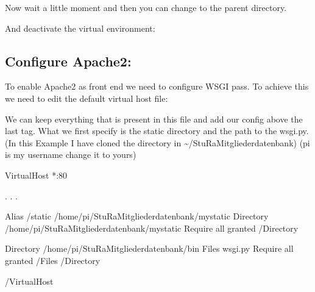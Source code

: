 \documentclass[letterpaper,10pt,english]{sphinxmanual}
\begin{document}
Now wait a little moment and then you can change to the parent directory.
\begin{quote}

\end{quote}

And deactivate the virtual environment:
\begin{quote}

\end{quote}


\subsection{Configure Apache2:}
\label{\detokenize{masterAdminDoc:configure-apache2}}
To enable Apache2 as front end we need to configure WSGI pass.
To achieve this we need to edit the default virtual host file:
\begin{quote}

\end{quote}

We can keep everything that is present in this file and add our config above
the last  tag. What we first specify is the static directory
and the path to the wsgi.py.
(In this Example I have cloned the directory in \textasciitilde{}/StuRa\sphinxhyphen{}Mitgliederdatenbank)
(pi is my username change it to yours)
\def\sphinxLiteralBlockLabel{\label{\detokenize{masterAdminDoc:id1}}}
\begin{sphinxVerbatim}[commandchars=\\\{\}]
\PYGZlt{}VirtualHost *:80\PYGZgt{}

  . . .

  Alias /static /home/pi/StuRa\PYGZhy{}Mitgliederdatenbank/mystatic
  \PYGZlt{}Directory /home/pi/StuRa\PYGZhy{}Mitgliederdatenbank/mystatic\PYGZgt{}
      Require all granted
  \PYGZlt{}/Directory\PYGZgt{}

  \PYGZlt{}Directory /home/pi/StuRa\PYGZhy{}Mitgliederdatenbank/bin\PYGZgt{}
    \PYGZlt{}Files wsgi.py\PYGZgt{}
      Require all granted
    \PYGZlt{}/Files\PYGZgt{}
  \PYGZlt{}/Directory\PYGZgt{}

\PYGZlt{}/VirtualHost\PYGZgt{}
\end{sphinxVerbatim}
\end{document}
